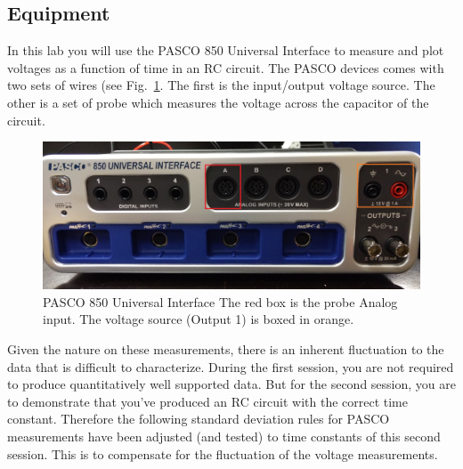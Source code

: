 \documentclass[12pt]{report}
\begin{document}
\subsection{Equipment} \label{Sect:lab2-equipment}
In this lab you will use the PASCO 850 Universal Interface to measure and plot voltages as a function of time in an RC circuit. The PASCO devices comes with two sets of wires (see Fig.~\ref{Fig:lab2-PASCO}. The first is the input/output voltage source. The other is a set of probe which measures the voltage across the capacitor of the circuit. 

\begin{figure}[h]
\centering
\includegraphics[width=0.8\linewidth]{lab2-PASCO}
\caption{PASCO 850 Universal Interface The red box is the probe Analog input. The voltage source (Output 1) is boxed in orange.}
\label{Fig:lab2-PASCO}
\end{figure}

Given the nature on these measurements, there is an inherent fluctuation to the data that is difficult to characterize. During the first session, you are not required to produce quantitatively well supported data. But for the second session, you are to demonstrate that you've produced an RC circuit with the correct time constant. Therefore the following standard deviation rules for PASCO measurements have been adjusted (and tested) to time constants of this second session. This is to compensate for the fluctuation of the voltage measurements.

\end{document}
